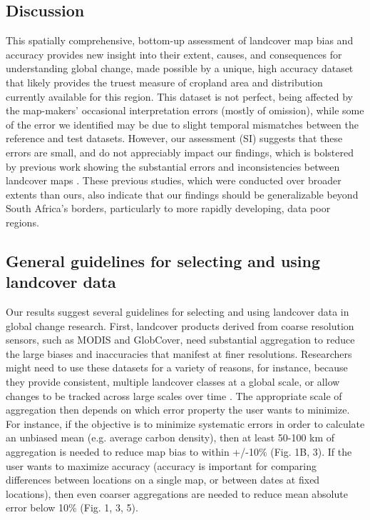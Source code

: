 \documentclass{pnastwo}
\begin{document}
\begin{article}
\section{Discussion}
This spatially comprehensive, bottom-up assessment of landcover map bias and accuracy provides new insight into their extent, causes, and consequences for understanding global change, made possible by a unique, high accuracy dataset that likely provides the truest measure of cropland area and distribution currently available for this region. This dataset is not perfect, being affected by the map-makers' occasional interpretation errors (mostly of omission), while some of the error we identified may be due to slight temporal mismatches between the reference and test datasets. However, our assessment (SI) suggests that these errors are small, and do not appreciably impact our findings, which is bolstered by previous work showing the substantial errors and inconsistencies between landcover maps \cite{fritz_comparison_2010,gross_monitoring_2013}. These previous studies, which were conducted over broader extents than ours, also indicate that our findings should be generalizable beyond South Africa's borders, particularly to more rapidly developing, data poor regions.

\subsection{General guidelines for selecting and using landcover data}
Our results suggest several guidelines for selecting and using landcover data in global change research. First, landcover products derived from coarse resolution sensors, such as MODIS and GlobCover, need substantial aggregation to reduce the large biases and inaccuracies that manifest at finer resolutions. Researchers might need to use these datasets for a variety of reasons, for instance, because they provide consistent, multiple landcover classes at a global scale, or allow changes to be tracked across large scales over time \cite{luoto_predicting_2004}. The appropriate scale of aggregation then depends on which error property the user wants to minimize. For instance, if the objective is to minimize systematic errors in order to calculate an unbiased mean (e.g. average carbon density), then at least 50-100 km of aggregation is needed to reduce map bias to within +/-10\% (Fig. 1B, 3). If the user wants to maximize accuracy (accuracy is important for comparing differences between locations on a single map, or between dates at fixed locations), then even coarser aggregations are needed to reduce mean absolute error below 10\% (Fig. 1, 3, 5).  


\end{article}
\end{document}
